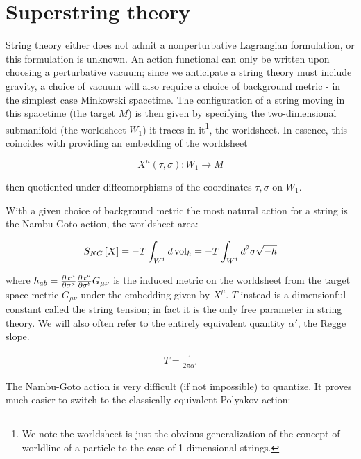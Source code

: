 
\section{Superstring theory}

String theory either does not admit a nonperturbative Lagrangian formulation, or this formulation is unknown. An action functional can only be written upon choosing a perturbative vacuum; since we anticipate a string theory must include gravity, a choice of vacuum will also require a choice of background metric - in the simplest case Minkowski spacetime. The configuration of a string moving in this spacetime (the target $M$) is then given by specifying the two-dimensional submanifold (the worldsheet $W_1$) it traces in it\footnote{We note the worldsheet is just the obvious generalization of the concept of worldline of a particle to the case of 1-dimensional strings.}, the worldsheet. In essence, this coincides with providing an embedding of the worldsheet

\begin{equation}
	X^{\mu} (\tau,\sigma) : W_1 \rightarrow M
	\label{}
\end{equation}

then quotiented under diffeomorphisms of the coordinates $\tau,\sigma$ on $W_1$.

With a given choice of background metric the most natural action for a string is the Nambu-Goto action, the worldsheet area:

\begin{equation}
	S_{NG}\left[ X \right] = - T \int_{W^1} d\operatorname{vol}_h = - T \int_{W^1} d^2 \sigma \sqrt{-h}
	\label{}
\end{equation}

where $h_{ab} = \frac{\partial x^\mu}{\partial\sigma^a} \frac{\partial x^\nu}{\partial\sigma^b} G_{\mu\nu}$ is the induced metric on the worldsheet from the target space metric $G_{\mu\nu}$ under the embedding given by $X^\mu$. $T$ instead is a dimensionful constant called the string tension; in fact it is the only free parameter in string theory. We will also often refer to the entirely equivalent quantity $\alpha'$, the Regge slope. 

\begin{align}
	T = \frac{1}{2\pi\alpha'}
	\label{}
\end{align}

The Nambu-Goto action is very difficult (if not impossible) to quantize. It proves much easier to switch to the classically equivalent Polyakov action: 


